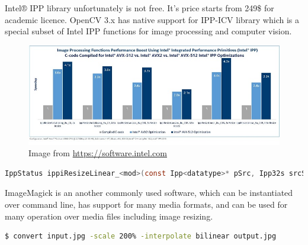 \documentclass[]{article}
\begin{document}
		\justifying Intel® IPP library unfortunately is not free. It's price starts from 249\$ for academic licence. OpenCV 3.x has native support for IPP-ICV library which is a special subset of Intel IPP functions for image processing and computer vision. 
		\vspace{1 cm}
		\begin{figure}[H]
				 	\centering
					\includegraphics[scale=1.25]{../Figures/IPP2018-imageprocessing-performance.jpg}
					\caption{\label{fig:ipp_img_performance} Image from \url{https://software.intel.com}}
		\end{figure}
		\vspace{1 cm}
		\begin{lstlisting}[language=C,caption={Intel® IPP Prototype of Bilinear Upsampling Function}]
IppStatus ippiResizeLinear_<mod>(const Ipp<datatype>* pSrc, Ipp32s srcStep, Ipp<datatype>* pDst, Ipp32s dstStep, IppiPoint dstOffset, IppiSize dstSize, IppiBorderType border, const Ipp<datatype>* pBorderValue, const IppiResizeSpec_32f* pSpec, Ipp8u* pBuffer)
		\end{lstlisting}
		\vspace{1 cm}		
		
		\justifying ImageMagick is an another commonly used software, which can be instantiated over command line, has support for many media formats, and can be used for many operation over media files including image resizing. 
		\begin{lstlisting}[language=bash,caption={Sample code for image resizing.}]
$ convert input.jpg -scale 200% -interpolate bilinear output.jpg
		\end{lstlisting}



\end{document}

